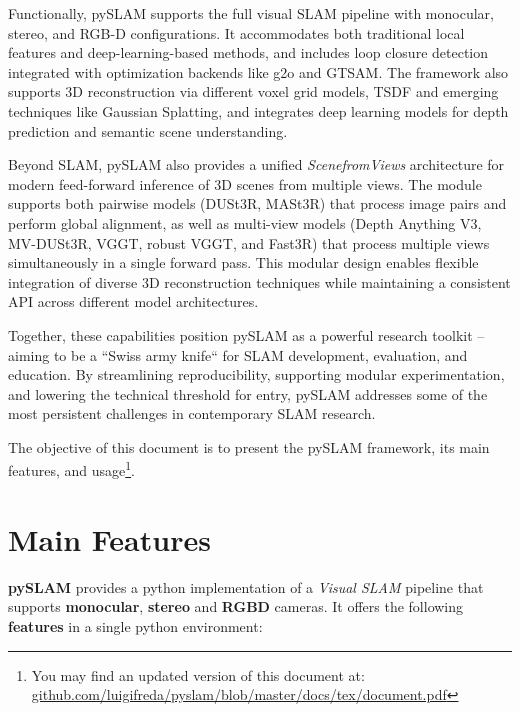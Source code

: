 \documentclass{article}
\begin{document}
Functionally, pySLAM supports the full visual SLAM pipeline with monocular, stereo, and RGB-D configurations. It accommodates both traditional local features and deep-learning-based methods, and includes loop closure detection integrated with optimization backends like g2o\cite{g2o_kummerle} and GTSAM\cite{factor_graphs_for_robot_perception}. The framework also supports 3D reconstruction via different voxel grid models, TSDF\cite{dong2022ash} and emerging techniques like Gaussian Splatting\cite{bao20253d}, and integrates deep learning models for depth prediction and semantic scene understanding.

Beyond SLAM, pySLAM also provides a unified \textit{ScenefromViews} architecture for modern feed-forward inference of 3D scenes from multiple views. The module supports both pairwise models (DUSt3R\cite{wang2023dust3r}, MASt3R\cite{leroy2024grounding}) that process image pairs and perform global alignment, as well as multi-view models (Depth Anything V3\cite{depthanything3}, MV-DUSt3R\cite{tang2025mv}, VGGT\cite{wang2025vggt}, robust VGGT\cite{vggt_robust}, and Fast3R\cite{yang2025fast3r}) that process multiple views simultaneously in a single forward pass. This modular design enables flexible integration of diverse 3D reconstruction techniques while maintaining a consistent API across different model architectures.

Together, these capabilities position pySLAM as a powerful research toolkit -- aiming to be a ``Swiss army knife`` for SLAM development, evaluation, and education. By streamlining reproducibility, supporting modular experimentation, and lowering the technical threshold for entry, pySLAM addresses some of the most persistent challenges in contemporary SLAM research.

The objective of this document is to present the pySLAM framework, its main features, and usage\footnote{You may find an updated version of this document at:\\ \href{https://github.com/luigifreda/pyslam/blob/master/docs/tex/document.pdf}{github.com/luigifreda/pyslam/blob/master/docs/tex/document.pdf}}. 


\section{Main Features}

\textbf{pySLAM} provides a python implementation of a \emph{Visual SLAM} pipeline that supports \textbf{monocular}, \textbf{stereo} and
\textbf{RGBD} cameras. It offers the following \textbf{features} in a single python environment: 
\end{document}
